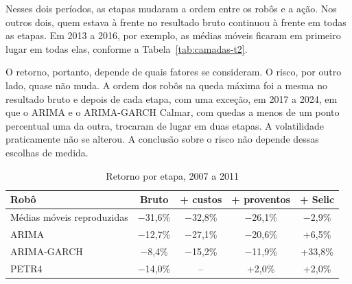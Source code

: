 Nesses dois períodos, as etapas mudaram a ordem entre os robôs e a ação. Nos
outros dois, quem estava à frente no resultado bruto continuou à frente em todas
as etapas. Em 2013 a 2016, por exemplo, as médias móveis ficaram em primeiro lugar
em todas elas, conforme a Tabela~\ref{tab:camadas-t2}.

O retorno, portanto, depende de quais fatores se consideram. O risco, por outro
lado, quase não muda. A ordem dos robôs na queda máxima foi a mesma no resultado
bruto e depois de cada etapa, com uma exceção, em 2017 a 2024, em que o ARIMA e o
ARIMA-GARCH Calmar, com quedas a menos de um ponto percentual uma da outra,
trocaram de lugar em duas etapas. A volatilidade praticamente não se alterou. A conclusão sobre o risco não depende dessas escolhas de medida.

\begin{table}[htbp]
\centering
\caption{Retorno por etapa, 2007 a 2011}
\label{tab:camadas-t1}
\fontsize{10}{12}\selectfont
\begin{tabular}{l|c|c|c|c}
\hline
Robô & Bruto & + custos & + proventos & + Selic \\
\hline
Médias móveis reproduzidas & $-$31,6\% & $-$32,8\% & $-$26,1\% & $-$2,9\% \\
\hline
ARIMA & $-$12,7\% & $-$27,1\% & $-$20,6\% & +6,5\% \\
\hline
ARIMA-GARCH & $-$8,4\% & $-$15,2\% & $-$11,9\% & +33,8\% \\
\hline
PETR4 & $-$14,0\% & -- & +2,0\% & +2,0\% \\
\hline
\end{tabular}
\end{table}

